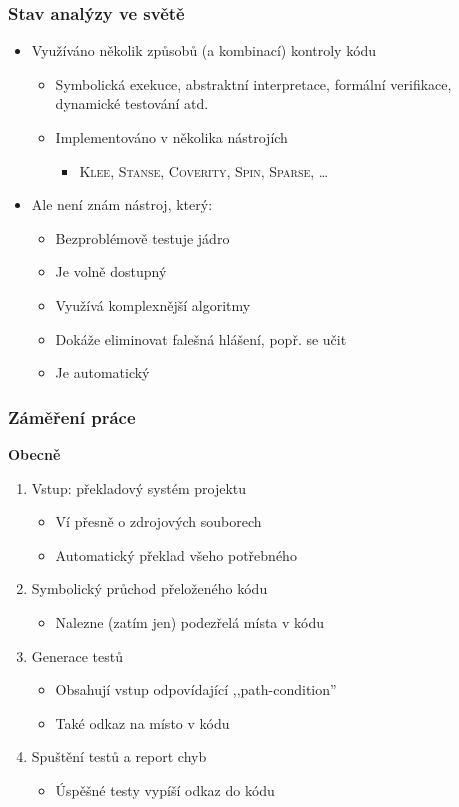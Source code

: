 \documentclass[xcolor=dvipsnames]{beamer}
\newcommand{\heading}[1]{\textbf{\textcolor{BurntOrange}{#1}}}
\begin{document}
\begin{frame}
  \frametitle{Stav analýzy ve světě}
  \begin{itemize}
  \item Využíváno několik způsobů (a kombinací) kontroly kódu
  \begin{itemize}
  \item Symbolická exekuce, abstraktní interpretace, formální verifikace,
    dynamické testování atd.
  \item Implementováno v několika nástrojích
  \begin{itemize}
  \item \textsc{Klee}, \textsc{Stanse}, \textsc{Coverity}, \textsc{Spin},
    \textsc{Sparse}, \ldots
  \end{itemize}
  \end{itemize}

  \pause
  \medskip

  \item Ale není znám nástroj, který:
  \begin{itemize}
  \item Bezproblémově testuje jádro
  \item Je volně dostupný
  \item Využívá komplexnější algoritmy
  \item Dokáže eliminovat falešná hlášení, popř. se učit
  \item Je automatický
  \end{itemize}
  \end{itemize}

\end{frame}

\begin{frame}
  \frametitle{Záměření práce}
  \heading{Obecně}
  \begin{enumerate}
  \item Vstup: překladový systém projektu
  \begin{itemize}
  \item Ví přesně o zdrojových souborech
  \item Automatický překlad všeho potřebného
  \end{itemize}\pause
  \item Symbolický průchod přeloženého kódu
  \begin{itemize}
  \item Nalezne (zatím jen) podezřelá místa v kódu
  \end{itemize}\pause
  \item Generace testů
  \begin{itemize}
  \item Obsahují vstup odpovídající ,,path-condition''
  \item Také odkaz na místo v kódu
  \end{itemize}\pause
  \item Spuštění testů a report chyb
  \begin{itemize}
  \item Úspěšné testy vypíší odkaz do kódu
  \end{itemize}
  \end{enumerate}

\end{frame}
\end{document}

